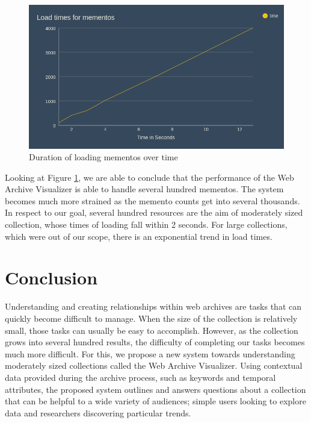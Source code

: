 \documentclass[10pt,journal,compsoc]{IEEEtran}
\begin{document}
\begin{figure}[b]
\centering
\includegraphics[scale=0.2]{Figure5}
\caption{Duration of loading mementos over time}
\label{fig:mesh4}
\end{figure}

Looking at Figure \ref{fig:mesh4}, we are able to conclude that the performance of the Web Archive Visualizer is able to handle several hundred mementos. The system becomes much more strained as the memento counts get into several thousands. In respect to our goal, several hundred resources are the aim of moderately sized collection, whose times of loading fall within 2 seconds. For large collections, which were out of our scope, there is an exponential trend in load times. \par

\section{Conclusion}
Understanding and creating relationships within web archives are tasks that can quickly become difficult to manage. When the size of the collection is relatively small, those tasks can usually be easy to accomplish. However, as the collection grows into several hundred results, the difficulty of completing our tasks becomes much more difficult. For this, we propose a new system towards understanding moderately sized collections called the Web Archive Visualizer. Using contextual data provided during the archive process, such as keywords and temporal attributes, the proposed system outlines and answers questions about a collection that can be helpful to a wide variety of audiences; simple users looking to explore data and researchers discovering particular trends. \par
\end{document}
